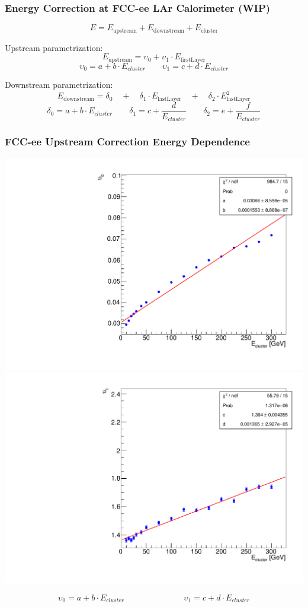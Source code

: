 \documentclass{beamer}
\newcommand{\redtext}[1]{%
  \textcolor{myRed}{#1}
}
\begin{document}
\begin{frame}
  \frametitle{Energy Correction at FCC-ee LAr Calorimeter (WIP)}

  \begin{equation*}
    E = E_\text{upstream} + E_\text{downstream} + E_\text{cluster}
  \end{equation*}

  \redtext{Upstream} parametrization:
  \begin{equation*}
  E_\text{upstream} = \upsilon_0 + \upsilon_1 \cdot E_\text{firstLayer}
  \end{equation*}
  \begin{equation*}
    \upsilon_0 = a + b \cdot E_{cluster}  \qquad
    \upsilon_1 = c + d \cdot E_{cluster}
  \end{equation*}

  \redtext{Downstream} parametrization:
  \begin{equation*}
  E_\text{downstream} = \delta_0 \quad + \quad
                        \delta_1 \cdot E_\text{lastLayer} \quad + \quad
                        \delta_2 \cdot E_\text{lastLayer}^{2}
  \end{equation*}
  \begin{equation*}
    \delta_0 = a + b \cdot E_{cluster}  \qquad
    \delta_1 = c + \frac{d}{E_{cluster}} \qquad
    \delta_2 = e + \frac{f}{E_{cluster}}
  \end{equation*}
\end{frame}

\begin{frame}
  \frametitle{FCC-ee Upstream Correction Energy Dependence}

  \begin{adjustwidth}{-9mm}{-9mm}
    \includegraphics[width=0.49\linewidth]{figures/12layers/graph_upstream_upsilon_0.pdf}
    \includegraphics[width=0.49\linewidth]{figures/12layers/graph_upstream_upsilon_1.pdf}\\[-3ex]
  \end{adjustwidth}
  \begin{equation*}
    \upsilon_0 = a + b \cdot E_{cluster}  \hspace{3cm}
    \upsilon_1 = c + d \cdot E_{cluster}
  \end{equation*}
\end{frame}
\end{document}
